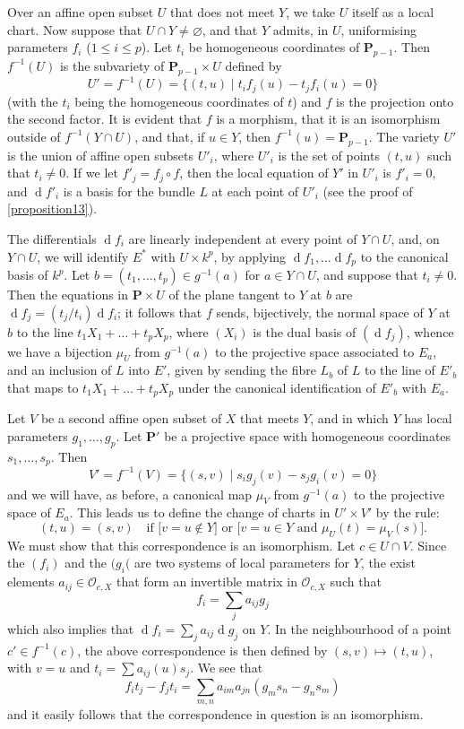 \documentclass{article}
\theoremstyle{plain}
\theoremstyle{definition}
\newcommand{\sh}{\mathscr}
\newcommand{\PP}{\mathbf{P}}
\newcommand{\dd}{\operatorname{d}\!}
\renewcommand{\leq}{\leqslant}
\newcommand{\oldpage}[1]{\marginpar{\footnotesize$\Big\vert$ \textit{p.~#1}}}
\begin{document}
Over an affine open subset $U$ that does not meet $Y$, we take $U$ itself as a local chart.
Now suppose that $U\cap Y\neq\varnothing$, and that $Y$ admits, in $U$, uniformising parameters $f_i$ ($1\leq i\leq p$).
Let $t_i$ be homogeneous coordinates of $\PP_{p-1}$.
Then $f^{-1}(U)$ is the subvariety of $\PP_{p-1}\times U$ defined by
\[
  U' = f^{-1}(U) = \big\{(t,u) \mid t_if_j(u)-t_jf_i(u)=0\big\}
\]
(with the $t_i$ being the homogeneous coordinates of $t$) and $f$ is the projection onto the second factor.
It is evident that $f$ is a morphism, that it is an isomorphism outside of $f^{-1}(Y\cap U)$, and that, if $u\in Y$, then $f^{-1}(u)=\PP_{p-1}$.
The variety $U'$ is the union of affine open subsets $U'_i$, where $U'_i$ is the set of points $(t,u)$ such that $t_i\neq 0$.
If we let $f'_j=f_j\circ f$, then the local equation of $Y'$ in $U'_i$ is $f'_i=0$, and $\dd f'_i$ is a basis for the bundle $L$ at each point of $U'_i$ (see the proof of \cref{proposition13}).

The differentials $\dd f_i$ are linearly independent at every point of $Y\cap U$, and, on $Y\cap U$, we will identify $E^*$ with $U\times k^p$, by applying $\dd f_1,\ldots\dd f_p$ to the canonical basis of $k^p$.
Let $b=(t_1,\ldots,t_p)\in g^{-1}(a)$ for $a\in Y\cap U$, and suppose that $t_i\neq 0$.
Then the equations in $\PP\times U$ of the plane tangent to $Y$ at $b$ are $\dd f_j=(t_j/t_i)\dd f_i$;
it follows that $f$ sends, bijectively, the normal space of $Y$ at $b$ to the line $t_1X_1+\ldots+t_pX_p$, where $(X_i)$ is the dual basis of $(\dd f_j)$, whence we have a bijection $\mu_U$ from $g^{-1}(a)$ to the projective space associated to $E_a$, and an inclusion of $L$ into $E'$, given by sending the fibre $L_b$ of $L$ to the line of $E'_b$ that maps to $t_1X_1+\ldots+t_pX_p$ under the canonical identification of $E'_b$ with $E_a$.

Let $V$ be a second affine open subset of $X$ that meets $Y$, and in which $Y$ has local parameters $g_1,\ldots,g_p$.
Let $\PP'$ be a projective space with homogeneous coordinates $s_1,\ldots,s_p$.
Then
\[
  V' = f^{-1}(V) = \big\{(s,v) \mid s_ig_j(v)-s_jg_i(v)=0\big\}
\]
and we will have, as before, a canonical map $\mu_V$ from $g^{-1}(a)$ to the projective space of $E_a$.
This leads us to define the change of charts in $U'\times V'$ by the rule:
\[
  (t,u) = (s,v)
  \quad\mbox{if [$v=u\not\in Y$] or [$v=u\in Y$ and $\mu_U(t)=\mu_V(s)$].}
\]
We must show that this correspondence is an isomorphism.
Let $c\in U\cap V$.
Since the $(f_i)$ and the $(g_i($ are two systems of local parameters for $Y$, the exist elements $a_{ij}\in\sh{O}_{c,X}$ that form an invertible matrix in $\sh{O}_{c,X}$
\oldpage{127}
such that
\[
  f_i = \sum_j a_{ij}g_j
\]
which also implies that $\dd f_i = \sum_j a_{ij}\dd g_j$ on $Y$.
In the neighbourhood of a point $c'\in f^{-1}(c)$, the above correspondence is then defined by $(s,v)\mapsto(t,u)$, with $v=u$ and $t_i=\sum a_{ij}(u)s_j$.
We see that
\[
  f_it_j-f_jt_i = \sum_{m,n} a_{im}a_{jn}(g_ms_n-g_ns_m)
\]
and it easily follows that the correspondence in question is an isomorphism.
\end{document}
